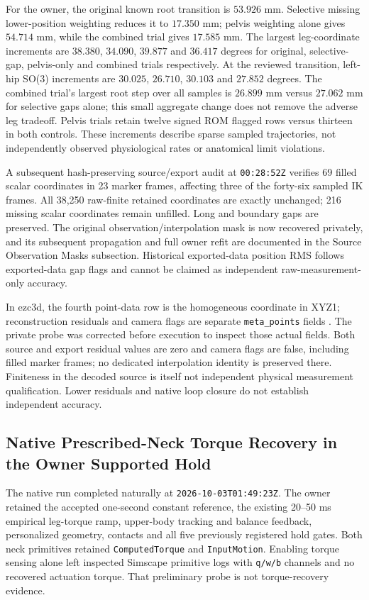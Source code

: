 \documentclass[11pt,a4paper]{article}
\begin{document}
For the owner, the original known root transition is $53.926$ mm.
Selective missing lower-position weighting reduces it to $17.350$ mm;
pelvis weighting alone gives $54.714$ mm, while the combined trial gives
$17.585$ mm. The largest leg-coordinate increments are $38.380$,
$34.090$, $39.877$ and $36.417$ degrees for original, selective-gap,
pelvis-only and combined trials respectively. At the reviewed transition,
left-hip SO(3) increments are $30.025$, $26.710$, $30.103$ and $27.852$
degrees. The combined trial's largest root step over all samples is
$26.899$ mm versus $27.062$ mm for selective gaps alone; this small
aggregate change does not remove the adverse leg tradeoff. Pelvis trials
retain twelve signed ROM flagged rows versus thirteen in both controls.
These increments describe sparse sampled trajectories, not independently
observed physiological rates or anatomical limit violations.

A subsequent hash-preserving source/export audit at
\texttt{00:28:52Z} verifies 69 filled scalar coordinates in 23 marker
frames, affecting three of the forty-six sampled IK frames. All 38,250
raw-finite retained coordinates are exactly unchanged; 216 missing
scalar coordinates remain unfilled. Long and boundary gaps are preserved.
The original observation/interpolation mask is now recovered privately,
and its subsequent propagation and full owner refit are documented in
the Source Observation Masks subsection. Historical exported-data
position RMS follows exported-data gap flags and cannot be
claimed as independent raw-measurement-only accuracy.

In ezc3d, the fourth point-data row is the homogeneous coordinate in
XYZ1; reconstruction residuals and camera flags are separate
\texttt{meta\_points} fields \cite{ezc3d}. The private probe was corrected
before execution to inspect those actual fields. Both source and export
residual values are zero and camera flags are false, including filled
marker frames; no dedicated interpolation identity is preserved there.
Finiteness in the decoded source is itself not independent physical
measurement qualification. Lower residuals and native loop closure do
not establish independent accuracy.


\subsection{Native Prescribed-Neck Torque Recovery in the Owner Supported Hold}
The native run completed naturally at \texttt{2026-10-03T01:49:23Z}.
The owner retained the accepted one-second constant reference, the existing
20--50 ms empirical leg-torque ramp, upper-body tracking and balance feedback,
personalized geometry, contacts and all five previously registered hold gates.
Both neck primitives retained \texttt{ComputedTorque} and \texttt{InputMotion}.
Enabling torque sensing alone left inspected Simscape primitive logs with
\texttt{q/w/b} channels and no recovered actuation torque. That preliminary
probe is not torque-recovery evidence.
\end{document}
